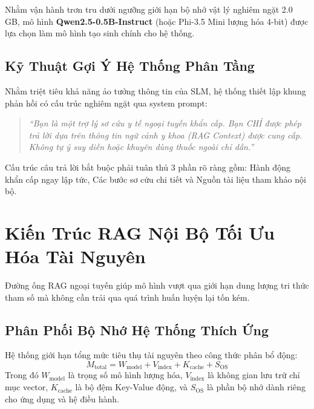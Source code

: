 \documentclass[journal]{IEEEtran}
\begin{document}
Nhằm vận hành trơn tru dưới ngưỡng giới hạn bộ nhớ vật lý nghiêm ngặt 2.0 GB, mô hình \textbf{Qwen2.5-0.5B-Instruct} (hoặc Phi-3.5 Mini lượng hóa 4-bit) được lựa chọn làm mô hình tạo sinh chính cho hệ thống.

\subsection{Kỹ Thuật Gợi Ý Hệ Thống Phân Tầng}
Nhằm triệt tiêu khả năng ảo tưởng thông tin của SLM, hệ thống thiết lập khung phản hồi có cấu trúc nghiêm ngặt qua system prompt:
\begin{quote}
\textit{``Bạn là một trợ lý sơ cứu y tế ngoại tuyến khẩn cấp. Bạn CHỈ được phép trả lời dựa trên thông tin ngữ cảnh y khoa (RAG Context) được cung cấp. Không tự ý suy diễn hoặc khuyên dùng thuốc ngoài chỉ dẫn.''}
\end{quote}

Cấu trúc câu trả lời bắt buộc phải tuân thủ 3 phần rõ ràng gồm: Hành động khẩn cấp ngay lập tức, Các bước sơ cứu chi tiết và Nguồn tài liệu tham khảo nội bộ.

\section{Kiến Trúc RAG Nội Bộ Tối Ưu Hóa Tài Nguyên}
Đường ống RAG ngoại tuyến giúp mô hình vượt qua giới hạn dung lượng tri thức tham số mà không cần trải qua quá trình huấn luyện lại tốn kém.

\subsection{Phân Phối Bộ Nhớ Hệ Thống Thích Ứng}
Hệ thống giới hạn tổng mức tiêu thụ tài nguyên theo công thức phân bổ động:
\begin{equation}
M_{\text{total}} = W_{\text{model}} + V_{\text{index}} + K_{\text{cache}} + S_{\text{OS}}
\end{equation}
Trong đó $W_{\text{model}}$ là trọng số mô hình lượng hóa, $V_{\text{index}}$ là không gian lưu trữ chỉ mục vector, $K_{\text{cache}}$ là bộ đệm Key-Value động, và $S_{\text{OS}}$ là phần bộ nhớ dành riêng cho ứng dụng và hệ điều hành.
\end{document}

